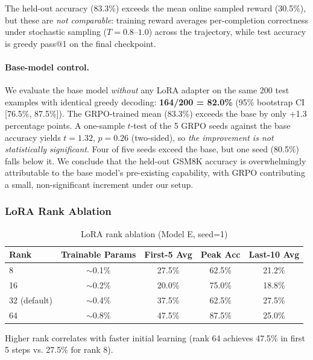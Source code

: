 \documentclass{article}
\begin{document}
The held-out accuracy (83.3\%) exceeds the mean online sampled reward (30.5\%), but these are \emph{not comparable}: training reward averages per-completion correctness under stochastic sampling ($T{=}0.8$--$1.0$) across the trajectory, while test accuracy is greedy pass@1 on the final checkpoint.

\paragraph{Base-model control.} We evaluate the base model \emph{without} any LoRA adapter on the same 200 test examples with identical greedy decoding: \textbf{164/200 = 82.0\%} (95\% bootstrap CI [76.5\%, 87.5\%]). The GRPO-trained mean (83.3\%) exceeds the base by only +1.3 percentage points. A one-sample $t$-test of the 5 GRPO seeds against the base accuracy yields $t{=}1.32$, $p{=}0.26$ (two-sided), so \emph{the improvement is not statistically significant}. Four of five seeds exceed the base, but one seed (80.5\%) falls below it. We conclude that the held-out GSM8K accuracy is overwhelmingly attributable to the base model's pre-existing capability, with GRPO contributing a small, non-significant increment under our setup.

\subsubsection{LoRA Rank Ablation}

\begin{table}[htbp]
    \centering
    \caption{LoRA rank ablation (Model E, seed=1)}
    \begin{tabular}{lcccc}
        \toprule
        Rank & Trainable Params & First-5 Avg & Peak Acc & Last-10 Avg \\
        \midrule
        8 & $\sim$0.1\% & 27.5\% & 62.5\% & 21.2\% \\
        16 & $\sim$0.2\% & 20.0\% & 75.0\% & 18.8\% \\
        32 (default) & $\sim$0.4\% & 37.5\% & 62.5\% & 27.5\% \\
        64 & $\sim$0.8\% & 47.5\% & 87.5\% & 25.0\% \\
        \bottomrule
    \end{tabular}
    \label{tab:lora_ablation}
\end{table}

Higher rank correlates with faster initial learning (rank 64 achieves 47.5\% in first 5 steps vs. 27.5\% for rank 8).
\end{document}
